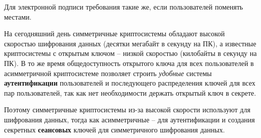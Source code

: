 Для электронной подписи требования такие же, если пользователей поменять местами.

На сегодняшний день симметричные криптосистемы обладают высокой скоростью шифрования данных (десятки мегабайт в секунду на ПК), а известные криптосистемы с открытым ключом -- низкой скоростью (килобайты в секунду на ПК). В то же время общедоступность открытого ключа для всех пользователей в асимметричной криптосистеме позволяет строить \emph{удобные} системы \textbf{аутентификации} пользователей и последующего распределения ключей для всех пар пользователей, так как нет необходимости держать открытый ключ в секрете.

Поэтому симметричные криптосистемы из-за высокой скорости используют для шифрования данных, тогда как асимметричные -- для аутентификации и создания секретных \textbf{сеансовых} ключей для симметричного шифрования данных.
